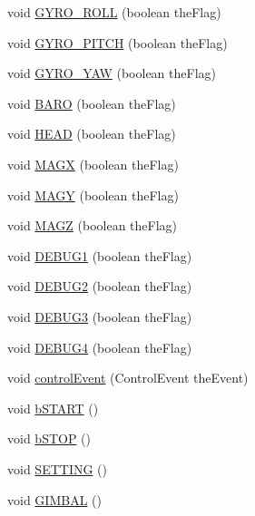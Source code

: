 \begin{DoxyCompactItemize}
\item 
void \hyperlink{classMultiWiiConf_ad2bba48b0cd3fcb136bb9a09ecf0cb97}{G\-Y\-R\-O\-\_\-\-R\-O\-L\-L} (boolean the\-Flag)
\item 
void \hyperlink{classMultiWiiConf_a5ce8a311ad06521d726afa6df0fb1ee1}{G\-Y\-R\-O\-\_\-\-P\-I\-T\-C\-H} (boolean the\-Flag)
\item 
void \hyperlink{classMultiWiiConf_a8de2c98857b1124230c10e3ae343accd}{G\-Y\-R\-O\-\_\-\-Y\-A\-W} (boolean the\-Flag)
\item 
void \hyperlink{classMultiWiiConf_ab2b544742052cc0f398e6d254dbf7208}{B\-A\-R\-O} (boolean the\-Flag)
\item 
void \hyperlink{classMultiWiiConf_a60b6a9d19c3a12f0a651e4a5fc4d2041}{H\-E\-A\-D} (boolean the\-Flag)
\item 
void \hyperlink{classMultiWiiConf_aa99d38abfa52b1977943450ab0b913ee}{M\-A\-G\-X} (boolean the\-Flag)
\item 
void \hyperlink{classMultiWiiConf_a255680567522dc391e65783f7dab433a}{M\-A\-G\-Y} (boolean the\-Flag)
\item 
void \hyperlink{classMultiWiiConf_aee488258d4ab0d58342d8be981773d49}{M\-A\-G\-Z} (boolean the\-Flag)
\item 
void \hyperlink{classMultiWiiConf_ace07c9638854159fd9648817459846de}{D\-E\-B\-U\-G1} (boolean the\-Flag)
\item 
void \hyperlink{classMultiWiiConf_a25f6849faf310fc390b3a509a1308edd}{D\-E\-B\-U\-G2} (boolean the\-Flag)
\item 
void \hyperlink{classMultiWiiConf_a4ee09f16beb6d49cc21b202a163af55d}{D\-E\-B\-U\-G3} (boolean the\-Flag)
\item 
void \hyperlink{classMultiWiiConf_a361d6de42848acf39896f4e1201028c2}{D\-E\-B\-U\-G4} (boolean the\-Flag)
\item 
void \hyperlink{classMultiWiiConf_a9b359c242f40d6dc074f45fbb79dee15}{control\-Event} (Control\-Event the\-Event)
\item 
void \hyperlink{classMultiWiiConf_a5d3204c23c47ac82aa08c5043022a504}{b\-S\-T\-A\-R\-T} ()
\item 
void \hyperlink{classMultiWiiConf_a3e0767e03653e3486978e2ba9a7463ea}{b\-S\-T\-O\-P} ()
\item 
void \hyperlink{classMultiWiiConf_a912ca48c44dc4cd130f75ecdccf7da84}{S\-E\-T\-T\-I\-N\-G} ()
\item 
void \hyperlink{classMultiWiiConf_a5157e3fae162d740189e25adca5dad1e}{G\-I\-M\-B\-A\-L} ()
\item 

\end{DoxyCompactItemize}

